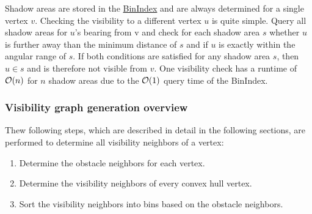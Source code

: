 			Shadow areas are stored in the \hyperref[subsec:binindex]{BinIndex} and are always determined for a single vertex $v$.
			Checking the visibility to a different vertex $u$ is quite simple.
			Query all shadow areas for $u$'s bearing from v and check for each shadow area $s$ whether $u$ is further away than the minimum distance of $s$ and if $u$ is exactly within the angular range of $s$.
			If both conditions are satisfied for any shadow area $s$, then $u \in s$ and is therefore not visible from $v$.
			One visibility check has a runtime of $\mathcal{O}(n)$ for $n$ shadow areas due to the $\mathcal{O}(1)$ query time of the BinIndex.
		
		\subsubsection{Visibility graph generation overview}
		
			Thew following steps, which are described in detail in the following sections, are performed to determine all visibility neighbors of a vertex:
			\begin{enumerate}[leftmargin=2.25em+\widthof{2.},label={2.\arabic*.}]
				\item Determine the obstacle neighbors for each vertex.
				\item Determine the visibility neighbors of every convex hull vertex.
				\item Sort the visibility neighbors into bins based on the obstacle neighbors.
			\end{enumerate}
		
